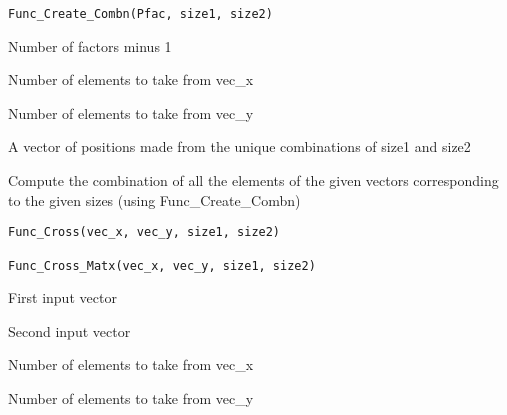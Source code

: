 \documentclass[a4paper]{book}
\begin{document}
%
\begin{Usage}
\begin{verbatim}
Func_Create_Combn(Pfac, size1, size2)
\end{verbatim}
\end{Usage}
%
\begin{Arguments}
\begin{ldescription}
\item[\code{Pfac}] Number of factors minus 1

\item[\code{size1}] Number of elements to take from vec\_x

\item[\code{size2}] Number of elements to take from vec\_y
\end{ldescription}
\end{Arguments}
%
\begin{Value}
A vector of positions made from the unique combinations
of size1 and size2
\end{Value}
%
\begin{Description}\relax
Compute the combination of all the elements of the given vectors
corresponding to the given sizes (using Func\_Create\_Combn)
\end{Description}
%
\begin{Usage}
\begin{verbatim}
Func_Cross(vec_x, vec_y, size1, size2)

Func_Cross_Matx(vec_x, vec_y, size1, size2)
\end{verbatim}
\end{Usage}
%
\begin{Arguments}
\begin{ldescription}
\item[\code{vec\_x}] First input vector

\item[\code{vec\_y}] Second input vector

\item[\code{size1}] Number of elements to take from vec\_x

\item[\code{size2}] Number of elements to take from vec\_y
\end{ldescription}
\end{Arguments}
\end{document}
